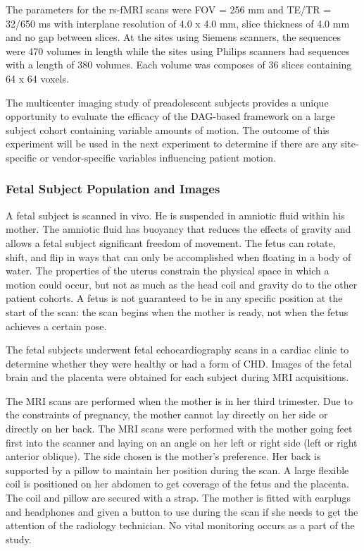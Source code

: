 The parameters for the rs-fMRI scans were FOV = 256 mm and TE/TR = 32/650 ms with interplane resolution of 4.0 x 4.0 mm, slice thickness of 4.0 mm and no gap between slices. At the sites using Siemens scanners, the sequences were 470 volumes in length while the sites using Philips scanners had sequences with a length of 380 volumes. Each volume was composes of 36 slices containing 64 x 64 voxels.

The multicenter imaging study of preadolescent subjects provides a unique opportunity to evaluate the efficacy of the DAG-based framework on a large subject cohort containing variable amounts of motion. The outcome of this experiment will be used in the next experiment to determine if there are any site-specific or vendor-specific variables influencing patient motion.

\subsubsection{Fetal Subject Population and Images}

A fetal subject is scanned in vivo. He is suspended in amniotic fluid within his mother. The amniotic fluid has buoyancy that reduces the effects of gravity and allows a fetal subject significant freedom of movement. The fetus can rotate, shift, and flip in ways that can only be accomplished when floating in a body of water. The properties of the uterus constrain the physical space in which a motion could occur, but not as much as the head coil and gravity do to the other patient cohorts. A fetus is not guaranteed to be in any specific position at the start of the scan: the scan begins when the mother is ready, not when the fetus achieves a certain pose. 

The fetal subjects underwent fetal echocardiography scans in a cardiac clinic to determine whether they were healthy or had a form of CHD. Images of the fetal brain and the placenta were obtained for each subject during MRI acquisitions.

The MRI scans are performed when the mother is in her third trimester. Due to the constraints of pregnancy, the mother cannot lay directly on her side or directly on her back. The MRI scans were performed with the mother going feet first into the scanner and laying on an angle on her left or right side (left or right anterior oblique). The side chosen is the mother's preference. Her back is supported by a pillow to maintain her position during the scan. A large flexible coil is positioned on her abdomen to get coverage of the fetus and the placenta. The coil and pillow are secured with a strap. The mother is fitted with earplugs and headphones and given a button to use during the scan if she needs to get the attention of the radiology technician. No vital monitoring occurs as a part of the study.

